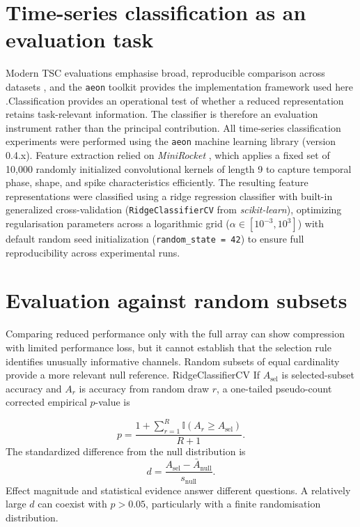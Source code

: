 \section{Time-series classification as an evaluation task}
Modern TSC evaluations emphasise broad, reproducible comparison across
datasets \citep{bagnall2017bakeoff,middlehurst2024bakeoff}, and the
\texttt{aeon} toolkit provides the implementation framework used here
\citep{middlehurst2024aeon}.Classification provides an operational test of whether a reduced representation retains task-relevant information. The classifier is therefore an evaluation instrument rather than the principal contribution. All time-series classification experiments were performed using the \texttt{aeon} machine learning library (version 0.4.x). Feature extraction relied on \textit{MiniRocket} \cite{dempster2021minirocket}, which applies a fixed set of 10,000 randomly initialized convolutional kernels of length 9 to capture temporal phase, shape, and spike characteristics efficiently. The resulting feature representations were classified using a ridge regression classifier with built-in generalized cross-validation (\texttt{RidgeClassifierCV}\citep{hoerl1970ridge,pedregosa2011sklearn} from \textit{scikit-learn}), optimizing regularisation parameters across a logarithmic grid ($\alpha \in [10^{-3}, 10^3]$) with default random seed initialization (\texttt{random\_state = 42}) to ensure full reproducibility across experimental runs.

\section{Evaluation against random subsets}
Comparing reduced performance only with the full array can show compression with limited performance loss, but it cannot establish that the selection rule identifies unusually informative channels. Random subsets of equal cardinality provide a more relevant null reference. RidgeClassifierCV \citep{hoerl1970ridge,pedregosa2011sklearn}If $A_{\mathrm{sel}}$ is selected-subset accuracy and $A_r$ is accuracy from random draw $r$, a one-tailed pseudo-count corrected empirical $p$-value is

\begin{equation}
 p=\frac{1+\sum_{r=1}^{R}\mathbb{I}(A_r\ge A_{\mathrm{sel}})}{R+1}.
\end{equation}
The standardized difference from the null distribution is
\begin{equation}
 d=\frac{A_{\mathrm{sel}}-\bar{A}_{\mathrm{null}}}{s_{\mathrm{null}}}.
\end{equation}
Effect magnitude and statistical evidence answer different questions. A relatively large $d$ can coexist with $p>0.05$, particularly with a finite randomisation distribution.

